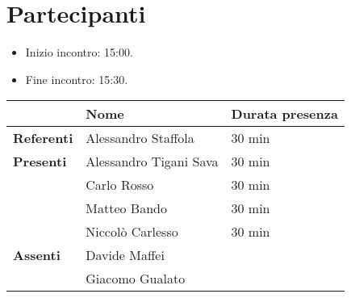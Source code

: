 \section{Partecipanti}

\begin{itemize}
    \item Inizio incontro: 15:00.
	\item Fine incontro: 15:30.
\end{itemize}


\begin{center}
{\renewcommand{\arraystretch}{1.5}
\begin{tabular}{l|ll}
	                    & \textbf{Nome}  			& \textbf{Durata presenza} 	\\
	\hline 
	\textbf{Referenti} 	& Alessandro Staffola		& 30 min	\\
	\hline
	\textbf{Presenti}   & Alessandro Tigani Sava    & 30 min 	\\   
		  				& Carlo Rosso           	& 30 min 	\\           
						& Matteo Bando        		& 30 min 	\\       
						& Niccolò Carlesso       	& 30 min 	\\   
	\hline
	\textbf{Assenti}	& Davide Maffei          	& 	\\   
						& Giacomo Gualato           & 	\\
\end{tabular}	
}
\end{center}
